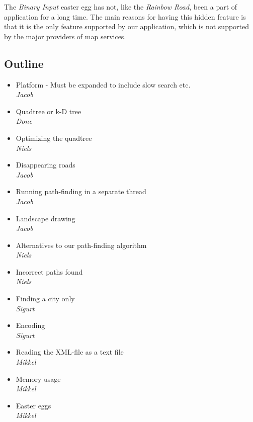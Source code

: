 \documentclass[a4paper,11pt]{article}
\begin{document}
The \textit{Binary Input} easter egg has not, like the \textit{Rainbow Road}, been a part of application for a long time. The main reasons for having this hidden feature is that it is the only feature supported by our application, which is not supported by the major providers of map services.

\subsection{Outline}
\begin{itemize}
	\item Platform - Must be expanded to include slow search etc. \\
		\textsl{Jacob}
	\item Quadtree or k-D tree \\
		\textsl{Done}
	\item Optimizing the quadtree \\
		\textsl{Niels}
	\item Disappearing roads \\
		\textsl{Jacob}
	\item Running path-finding in a separate thread \\
		\textsl{Jacob}
	\item Landscape drawing \\
		\textsl{Jacob}
	\item Alternatives to our path-finding algorithm \\
		\textsl{Niels}
	\item Incorrect paths found \\
		\textsl{Niels}
	\item Finding a city only \\
		\textsl{Sigurt}
	\item Encoding \\
		\textsl{Sigurt}
	\item Reading the XML-file as a text file \\
		\textsl{Mikkel}
	\item Memory usage \\
		\textsl{Mikkel}
	\item Easter eggs \\
		\textsl{Mikkel}
\end{itemize}


\pagebreak
\end{document}
